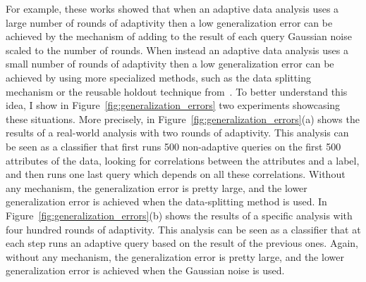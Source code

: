 For example, these works showed that when an adaptive data analysis uses a large number of rounds of adaptivity then a low generalization error can be achieved by the mechanism of 
adding to the result of each query Gaussian noise scaled to the number of rounds. When instead an adaptive data analysis uses a small number of rounds of adaptivity then a low generalization error can be achieved by using more specialized methods, such as the data splitting mechanism or the reusable holdout technique from~\cite{DworkFHPRR15}.
To better understand this idea, I show in Figure~\ref{fig:generalization_errors} two experiments showcasing these situations. 
More precisely, in Figure~\ref{fig:generalization_errors}(a) shows the results of a real-world analysis
with two rounds of adaptivity. 
This analysis can be seen as a classifier that first runs 500 non-adaptive queries on the first 500 attributes of the data, looking for correlations between the attributes and a label, and then runs one last query which depends on all these correlations. 
Without any mechanism, the generalization error is pretty large, and the lower generalization error is achieved when the data-splitting method is used. 
In Figure~\ref{fig:generalization_errors}(b) shows the results of a specific analysis
with four hundred rounds of adaptivity. 
This analysis can be seen as a classifier that at each step runs an adaptive query based on the result of the previous ones. 
Again, without any mechanism, the generalization error is pretty large, and the lower generalization error is achieved when the Gaussian noise is used. 
